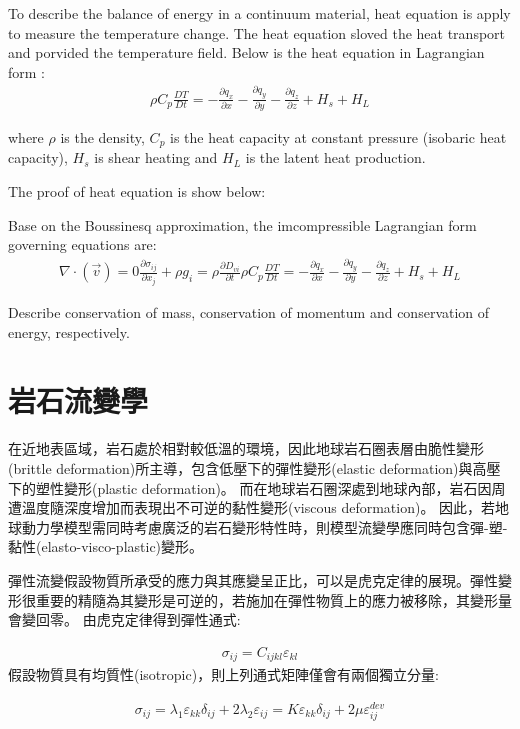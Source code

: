 To describe the balance of energy in a continuum material, heat equation is apply to measure the temperature change. The heat equation sloved the heat transport and porvided the temperature field. Below is the heat equation in Lagrangian form :
\begin{align}
\rho C_p \frac{DT}{Dt} = -\frac{\partial q_x}{\partial x}-\frac{\partial q_y}{\partial y}-\frac{\partial q_z}{\partial z}+H_s+H_L
\end{align}

where $\rho$ is the density, $C_p$ is the heat capacity at constant pressure (isobaric heat capacity), $H_s$ is shear heating and $H_L$ is the latent heat production.

The proof of heat equation is show below:

Base on the Boussinesq approximation, the imcompressible Lagrangian form governing equations are:
\begin{align}
\nabla \cdot (\vec v) = 0 
\frac{\partial \sigma_{ij}}{\partial x_j}+\rho g_i = \rho \frac{\partial D_{vi}}{\partial t}
\rho C_p \frac{DT}{Dt} = -\frac{\partial q_x}{\partial x}-\frac{\partial q_y}{\partial y}-\frac{\partial q_z}{\partial z}+H_s+H_L
\end{align}

Describe conservation of mass, conservation of momentum and conservation of energy, respectively.

\section{岩石流變學}

在近地表區域，岩石處於相對較低溫的環境，因此地球岩石圈表層由脆性變形(brittle deformation)所主導，包含低壓下的彈性變形(elastic deformation)與高壓下的塑性變形(plastic deformation)。
而在地球岩石圈深處到地球內部，岩石因周遭溫度隨深度增加而表現出不可逆的黏性變形(viscous deformation)。
因此，若地球動力學模型需同時考慮廣泛的岩石變形特性時，則模型流變學應同時包含彈-塑-黏性(elasto-visco-plastic)變形。

彈性流變假設物質所承受的應力與其應變呈正比，可以是虎克定律的展現。彈性變形很重要的精隨為其變形是可逆的，若施加在彈性物質上的應力被移除，其變形量會變回零。
由虎克定律得到彈性通式:

\begin{align}
\sigma_{ij}=C_{ijkl} 𝜀_{kl}
\end{align}
假設物質具有均質性(isotropic)，則上列通式矩陣僅會有兩個獨立分量:

\begin{align}
    σ_{ij}=λ_1 ε_{kk} δ_{ij}+2 λ_2 ε_{ij}=Kε_{kk} δ_{ij}+2 \mu ε_{ij}^{dev} \label{eqn:elastic tensor}
\end{align}

